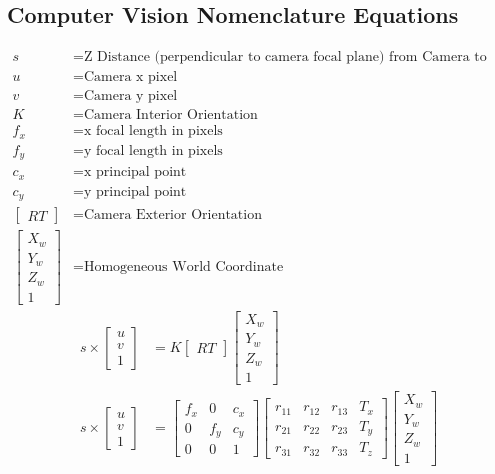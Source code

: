 \subsection{Computer Vision Nomenclature Equations}
\begin{align*}
s &= \text{Z Distance (perpendicular to camera focal plane) from Camera to XYZ world coordinate} \\
u &= \text{Camera x pixel} \\
v &= \text{Camera y pixel} \\
K & = \text{Camera Interior Orientation} \\
f_x &= \text{x focal length in pixels} \\
f_y &= \text{y focal length in pixels} \\
c_x &= \text{x principal point} \\
c_y &= \text{y principal point} \\
\begin{bmatrix} RT \end{bmatrix} &= \text{Camera Exterior Orientation} \\
\begin{bmatrix}	X_w \\ Y_w \\ Z_w \\ 1 \end{bmatrix} &= \text{Homogeneous World Coordinate}
\end{align*}
\begin{align*}
s\times
\begin{bmatrix}	u \\ v \\ 1 \end{bmatrix} 
&=
K
\begin{bmatrix} RT \end{bmatrix}
\begin{bmatrix}	X_w \\ Y_w \\ Z_w \\ 1 \end{bmatrix} \\
s\times
\begin{bmatrix}	u \\ v \\ 1 \end{bmatrix} 
&= \begin{bmatrix}
f_x & 0 & c_x \\
0 & f_y & c_y \\
0 & 0 & 1 
\end{bmatrix}
\begin{bmatrix}
r_{11} & r_{12} & r_{13} & T_x\\
r_{21} & r_{22} & r_{23} & T_y\\
r_{31} & r_{32} & r_{33} & T_z
\end{bmatrix}
\begin{bmatrix}	X_w \\ Y_w \\ Z_w \\ 1 \end{bmatrix}
\end{align*}

